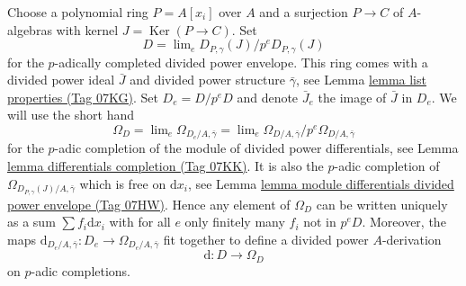 \documentclass{amsart}
\theoremstyle{plain}
\theoremstyle{definition}
\theoremstyle{remark}
\numberwithin{equation}{subsection}
\def\lim{\mathop{\mathrm{lim}}\nolimits}
\def\Ker{\mathop{\mathrm{Ker}}}
\begin{document}
\medskip\noindent
Choose a polynomial ring $P = A[x_i]$ over $A$ and a surjection $P \to C$
of $A$-algebras with kernel $J = \Ker(P \to C)$. Set
\begin{equation}
\label{equation-D}
D = \lim_e D_{P, \gamma}(J) / p^eD_{P, \gamma}(J)
\end{equation}
for the $p$-adically completed divided power envelope.
This ring comes with a divided power ideal $\bar J$ and divided power
structure $\bar \gamma$, see Lemma \href{https://stacks.math.columbia.edu/tag/07KG}{lemma list properties (Tag 07KG)}.
Set $D_e = D/p^eD$ and denote $\bar J_e$ the image of $\bar J$ in $D_e$.
We will use the short hand
\begin{equation}
\label{equation-omega-D}
\Omega_D = \lim_e \Omega_{D_e/A, \bar\gamma} =
\lim_e \Omega_{D/A, \bar\gamma}/p^e\Omega_{D/A, \bar\gamma}
\end{equation}
for the $p$-adic completion of the module of divided power differentials,
see Lemma \href{https://stacks.math.columbia.edu/tag/07KK}{lemma differentials completion (Tag 07KK)}.
It is also the $p$-adic completion of
$\Omega_{D_{P, \gamma}(J)/A, \bar\gamma}$
which is free on $\text{d}x_i$, see
Lemma \href{https://stacks.math.columbia.edu/tag/07HW}{lemma module differentials divided power envelope (Tag 07HW)}.
Hence any element of $\Omega_D$ can be written uniquely as a sum
$\sum f_i\text{d}x_i$ with for all $e$ only finitely many $f_i$
not in $p^eD$. Moreover, the maps
$\text{d}_{D_e/A, \bar\gamma} : D_e \to \Omega_{D_e/A, \bar\gamma}$
fit together to define a divided power $A$-derivation
\begin{equation}
\label{equation-derivation-D}
\text{d} : D \longrightarrow \Omega_D
\end{equation}
on $p$-adic completions.
\end{document}
